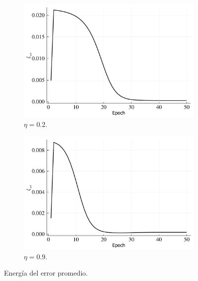 \documentclass[fleqn]{article}
\begin{document}
\begin{enumerate}
    \begin{figure}[H]
    \centering
    \begin{subfigure}[b]{0.45\textwidth}
        \centering
        \includegraphics[width=\textwidth]{2/Eav.pdf}
        \caption{$\eta=0.2$.}
        \label{fig:2}
    \end{subfigure}
    \begin{subfigure}[b]{0.45\textwidth}  
        \centering 
        \includegraphics[width=\textwidth]{9/Eav.pdf}
        \caption{$\eta=0.9$.}
        \label{fig:9}
    \end{subfigure}
    \caption{Energía del error promedio.}
    \label{fig:eav}
    \end{figure}
    
    

\end{enumerate}
\end{document}

